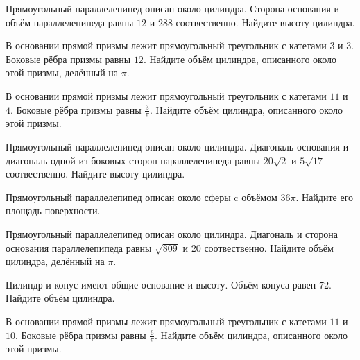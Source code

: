 \documentclass[4apaper]{article}
\begin{document}
\begin{taskBN}{66}
Прямоугольный параллелепипед описан около цилиндра. Сторона основания и объём параллелепипеда равны $12$ и $288$ соотвественно. Найдите высоту цилиндра.
\end{taskBN}

\begin{taskBN}{67}
В основании прямой призмы лежит прямоугольный треугольник с катетами $3$ и $3$. Боковые рёбра призмы равны $12$. Найдите объём цилиндра, описанного около этой призмы, делённый на $\pi$.
\end{taskBN}

\begin{taskBN}{68}
В основании прямой призмы лежит прямоугольный треугольник с катетами $11$ и $4$. Боковые рёбра призмы равны $\frac{3}{\pi}$. Найдите объём цилиндра, описанного около этой призмы.
\end{taskBN}

\begin{taskBN}{69}
Прямоугольный параллелепипед описан около цилиндра. Диагональ основания и диагональ одной из боковых сторон параллелепипеда равны $20\sqrt{2}$ и $5\sqrt{17}$ соотвественно. Найдите высоту цилиндра.
\end{taskBN}

\begin{taskBN}{70}
Прямоугольный параллелепипед описан около сферы c объёмом $36$$\pi$. Найдите его площадь поверхности. 
\end{taskBN}

\begin{taskBN}{71}
Прямоугольный параллелепипед описан около цилиндра. Диагональ и сторона основания параллелепипеда равны $\sqrt{809}$ и $20$ соотвественно. Найдите объём цилиндра, делённый на $\pi$.
\end{taskBN}

\begin{taskBN}{72}
Цилиндр и конус имеют общие основание и высоту. Объём конуса равен $72$. Найдите объём цилиндра.
\end{taskBN}

\begin{taskBN}{73}
В основании прямой призмы лежит прямоугольный треугольник с катетами $11$ и $10$. Боковые рёбра призмы равны $\frac{6}{\pi}$. Найдите объём цилиндра, описанного около этой призмы.
\end{taskBN}
\end{document}
